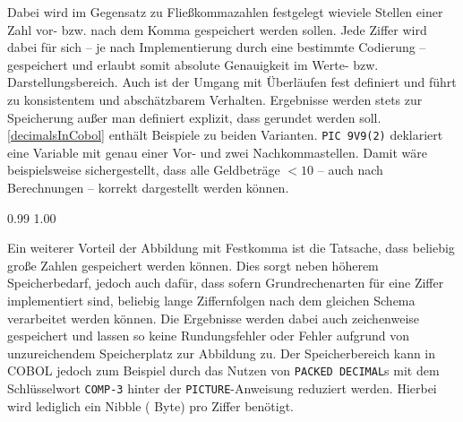 Dabei wird im Gegensatz zu Fließkommazahlen festgelegt wieviele Stellen einer Zahl vor- bzw. nach dem Komma gespeichert werden sollen. Jede Ziffer wird dabei für sich -- je nach Implementierung durch eine bestimmte Codierung -- gespeichert und erlaubt somit absolute Genauigkeit im Werte- bzw. Darstellungsbereich. Auch ist der Umgang mit Überläufen fest definiert und führt zu konsistentem und abschätzbarem Verhalten. Ergebnisse werden stets zur Speicherung  außer man definiert explizit, dass gerundet werden soll. \autoref{decimalsInCobol} enthält Beispiele zu beiden Varianten. \texttt{PIC 9V9(2)} deklariert eine Variable mit genau einer Vor- und zwei Nachkommastellen. Damit wäre beispielsweise sichergestellt, dass alle Geldbeträge $< 10$ -- auch nach Berechnungen -- korrekt dargestellt werden können.

\sepCodeAndOutputCheck
\begin{shellwindow}
0.99
1.00
\end{shellwindow}

Ein weiterer Vorteil der Abbildung mit Festkomma ist die Tatsache, dass beliebig große Zahlen gespeichert werden können. Dies sorgt neben höherem Speicherbedarf, jedoch auch dafür, dass sofern Grundrechenarten für eine Ziffer implementiert sind, beliebig lange Ziffernfolgen nach dem gleichen Schema verarbeitet werden können. Die Ergebnisse werden dabei auch zeichenweise gespeichert und lassen so keine Rundungsfehler oder Fehler aufgrund von unzureichendem Speicherplatz zur Abbildung zu. Der Speicherbereich kann in COBOL jedoch zum Beispiel durch das Nutzen von \texttt{PACKED DECIMAL}s mit dem Schlüsselwort \texttt{COMP-3} hinter der \texttt{PICTURE}-Anweisung reduziert werden. Hierbei wird lediglich ein Nibble ( Byte) pro Ziffer benötigt.



